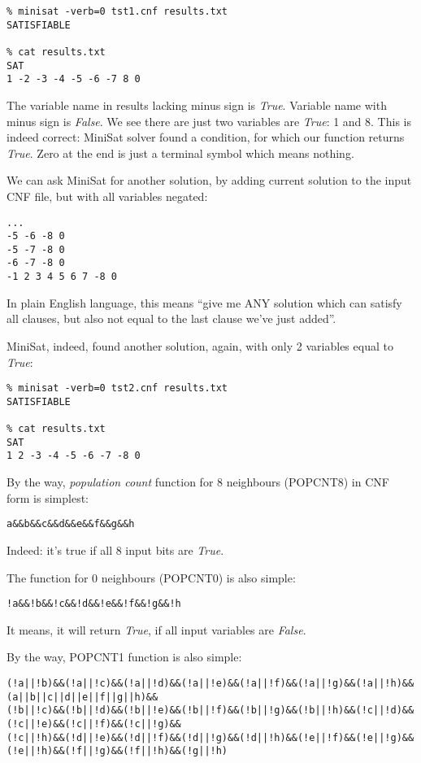\begin{lstlisting}
% minisat -verb=0 tst1.cnf results.txt
SATISFIABLE

% cat results.txt
SAT
1 -2 -3 -4 -5 -6 -7 8 0
\end{lstlisting}

The variable name in results lacking minus sign is \textit{True}.
Variable name with minus sign is \textit{False}.
We see there are just two variables are \textit{True}: 1 and 8.
This is indeed correct: MiniSat solver found a condition, for which our function returns \textit{True}.
Zero at the end is just a terminal symbol which means nothing.

We can ask MiniSat for another solution, by adding current solution to the input CNF file, but with all variables negated:

\begin{lstlisting}
...
-5 -6 -8 0
-5 -7 -8 0
-6 -7 -8 0
-1 2 3 4 5 6 7 -8 0
\end{lstlisting}

In plain English language, this means ``give me ANY solution which can satisfy all clauses, but also not equal to the last clause we've just added''.

MiniSat, indeed, found another solution, again, with only 2 variables equal to \textit{True}:

\begin{lstlisting}
% minisat -verb=0 tst2.cnf results.txt
SATISFIABLE

% cat results.txt
SAT
1 2 -3 -4 -5 -6 -7 -8 0
\end{lstlisting}

By the way, \textit{population count} function for 8 neighbours (POPCNT8) in CNF form is simplest:

\begin{lstlisting}
a&&b&&c&&d&&e&&f&&g&&h
\end{lstlisting}

Indeed: it's true if all 8 input bits are \textit{True}.

The function for 0 neighbours (POPCNT0) is also simple:

\begin{lstlisting}
!a&&!b&&!c&&!d&&!e&&!f&&!g&&!h
\end{lstlisting}

It means, it will return \textit{True}, if all input variables are \textit{False}.

By the way, POPCNT1 function is also simple:

\begin{lstlisting}
(!a||!b)&&(!a||!c)&&(!a||!d)&&(!a||!e)&&(!a||!f)&&(!a||!g)&&(!a||!h)&&(a||b||c||d||e||f||g||h)&&
(!b||!c)&&(!b||!d)&&(!b||!e)&&(!b||!f)&&(!b||!g)&&(!b||!h)&&(!c||!d)&&(!c||!e)&&(!c||!f)&&(!c||!g)&&
(!c||!h)&&(!d||!e)&&(!d||!f)&&(!d||!g)&&(!d||!h)&&(!e||!f)&&(!e||!g)&&(!e||!h)&&(!f||!g)&&(!f||!h)&&(!g||!h)
\end{lstlisting}

